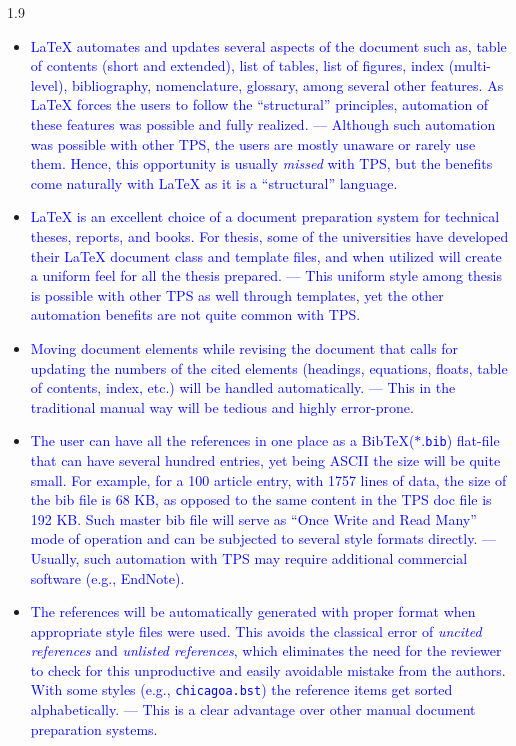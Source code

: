 \documentclass[phd]{ndsu-thesis-2022}
\newcommand\myspacing{1.9}      %
\newcommand\italk[1]{\textcolor{blue}{#1}}  %
\newcommand\lx{\LaTeX\xspace}
\newcommand\bx{Bib\!\TeX\xspace}
\newcommand\vb[1]{\textcolor{blue}{\texttt{#1}}}%
\begin{document}
\begin{spacing}{\myspacing}
\begin{itemize}[leftmargin=*, itemsep=0pt, parsep=3pt]
\item \italk{\lx automates and updates several aspects of the document such as, table of contents (short and extended), list of tables, list of figures, index (multi-level), bibliography, nomenclature, glossary, among several other features. As \lx forces the users to follow the ``structural'' principles, automation of these features was possible and fully realized. --- Although such automation was possible with other TPS, the users are mostly unaware or rarely use them. Hence, this opportunity is usually \emph{missed} with TPS, but the benefits come naturally with \lx as it is a ``structural'' language.}

\item \italk{\lx is an excellent choice of a document preparation system for technical theses, reports, and books.  For thesis, some of the universities have developed their \lx document class and template files, and when utilized will create a uniform feel for all the thesis prepared. --- This uniform style among thesis is possible with other TPS as well through templates, yet the other automation benefits are not quite common with TPS.}  

\item \italk{Moving document elements while revising the document that calls for updating the numbers of the cited elements (headings, equations, floats, table of contents, index, etc.) will be handled automatically. --- This in the traditional manual way will be tedious and highly error-prone.}   

\item \italk{The user can have all the references in one place as a \bx  ($\ast$.\vb{bib}) flat-file that can have several hundred entries, yet being ASCII the size will be quite small. For example, for a 100 article entry, with 1757 lines of data, the size of the bib file is 68 KB, as opposed to the same content in the TPS doc file is 192 KB. Such master bib file will serve as ``Once Write and Read Many'' mode of operation and can be subjected to several style formats directly. --- Usually, such automation with TPS may require additional commercial software (e.g., EndNote).} 

\item \italk{The references will be automatically generated with proper format when appropriate style files were used. This avoids the classical error of \emph{uncited references} and \emph{unlisted references}, which eliminates the need for the reviewer to check for this unproductive and easily avoidable mistake from the authors.  With some styles (e.g., \vb{chicagoa.bst}) the reference items get sorted alphabetically. --- This is a clear advantage over other manual document preparation systems.}   


\end{itemize}
\end{spacing}
\end{document}
